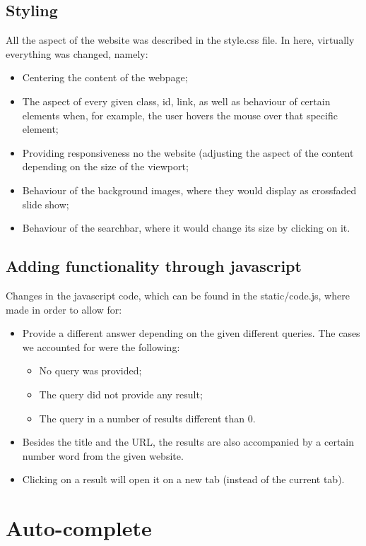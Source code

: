 \subsection{Styling}
All the aspect of the website was described in the style.css file. In here, virtually everything was changed, namely:
\begin{itemize}
    \item Centering the content of the webpage;
    \item The aspect of every given class, id, link, as well as behaviour of certain elements when, for example, the user hovers the mouse over that specific element;
    \item Providing responsiveness no the website (adjusting the aspect of the content depending on the size of the viewport;
    \item Behaviour of the background images, where they would display as crossfaded slide show;
    \item Behaviour of the searchbar, where it would change its size by clicking on it.
\end{itemize}

\subsection{Adding functionality through javascript}
Changes in the javascript code, which can be found in the static/code.js, where made in order to allow for:
\begin{itemize}
    \item Provide a different answer depending on the given different queries. The cases we accounted for were the following:
    \begin{itemize}
        \item No query was provided;
        \item The query did not provide any result;
        \item The query in a number of results different than $0$.
    \end{itemize}
    \item Besides the title and the URL, the results are also accompanied by a certain number word from the given website.
    \item Clicking on a result will open it on a new tab (instead of the current tab).
\end{itemize}

\section{Auto-complete}

